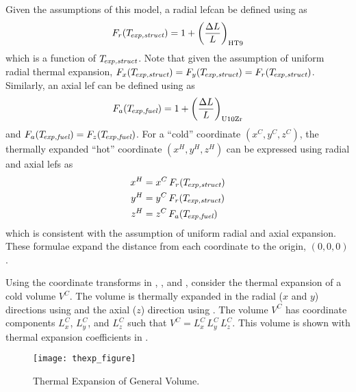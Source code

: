     Given the assumptions of this model, a radial \gls{lef}can be defined using 
     as
    \begin{equation}
      \label{eq:lef_r}
      F_r(T_{\!\mbox{\scriptsize \em exp,struct}}) = 1 + \left(\frac{\Delta L}{L}\right)_{\text{HT9}}
    \end{equation}
    which is a function of $T_{\!\mbox{\scriptsize \em exp,struct}}$. Note that given the assumption of 
    uniform radial thermal expansion, ${F_x(T_{\!\mbox{\scriptsize \em exp,struct}}) = F_y(T_{\!\mbox{\scriptsize \em exp,struct}}) =
    F_r(T_{\!\mbox{\scriptsize \em exp,struct}})}$.
    Similarly, an axial \gls{lef} can be defined using  as 
    \begin{equation}
      \label{eq:lef_a}
      F_a({T_{\!\mbox{\scriptsize \em exp,fuel}}}) = 1 + \left(\frac{\Delta L}{L}\right)_{\text{U10Zr}}
    \end{equation}
    and $F_a({T_{\!\mbox{\scriptsize \em exp,fuel}}}) = F_z({T_{\!\mbox{\scriptsize \em exp,fuel}}})$. For a ``cold'' coordinate 
    $(x^C,y^C,z^C)$, the thermally expanded ``hot'' coordinate $(x^H,y^H,z^H)$ 
    can be expressed using radial and axial \glspl{lef} as
    \begin{align}
      \label{eq:expand_x}
      x^H &= x^C \, F_r(T_{\!\mbox{\scriptsize \em exp,struct}}) \\
      \label{eq:expand_y}
      y^H &= y^C \, F_r(T_{\!\mbox{\scriptsize \em exp,struct}}) \\
      \label{eq:expand_z}
      z^H &= z^C \, F_a({T_{\!\mbox{\scriptsize \em exp,fuel}}})
    \end{align}
    which is consistent with the assumption of uniform radial and axial 
    expansion. These formulae expand the distance from each coordinate to the
    origin, $(0,0,0)$.

    Using the coordinate transforms in , , 
    and , consider the thermal expansion of a cold volume 
    $V^C$. The volume is thermally expanded in the radial ($x$ and $y$) 
    directions using  and the axial ($z$) direction using 
    . The volume $V^C$ has coordinate components $L_x^C$, 
    $L_y^C$, and $L_z^C$ such that ${V^C = L_x^C \, L_y^C \, L_z^C}$. This 
    volume is shown with thermal expansion coefficients in 
    .

    \begin{figure}
      \centering
      \texttt{[image: thexp\_figure]}
      \caption{Thermal Expansion of General Volume.}
      \label{fig:thexp_figure}
    \end{figure}
    
